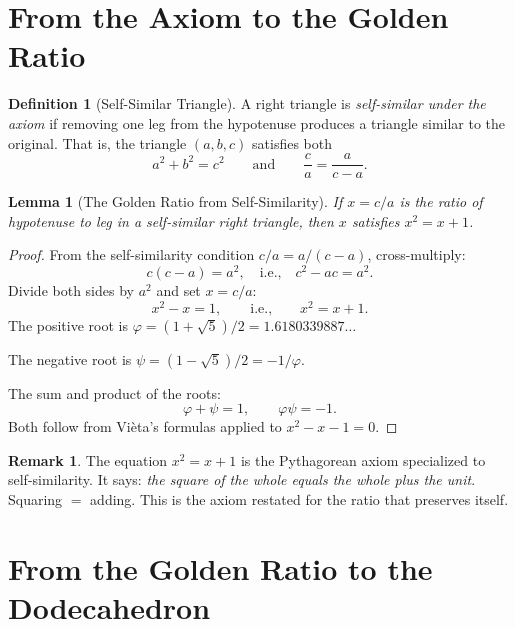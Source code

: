 \documentclass[11pt,a4paper]{article}
\theoremstyle{plain}
\newtheorem{lemma}[theorem]{Lemma}
\theoremstyle{definition}
\newtheorem{definition}[theorem]{Definition}
\newtheorem{remark}[theorem]{Remark}
\newcommand{\vp}{\varphi}
\begin{document}
\section{From the Axiom to the Golden Ratio}\label{sec:golden}

\begin{definition}[Self-Similar Triangle]\label{def:selfsim}
A right triangle is \emph{self-similar under the axiom} if removing one
leg from the hypotenuse produces a triangle similar to the original.
That is, the triangle $(a, b, c)$ satisfies both
\[
  a^2 + b^2 = c^2 \qquad\text{and}\qquad \frac{c}{a} = \frac{a}{c - a}.
\]
\end{definition}

\begin{lemma}[The Golden Ratio from Self-Similarity]\label{lem:golden}
If $x = c/a$ is the ratio of hypotenuse to leg in a self-similar right
triangle, then $x$ satisfies $x^2 = x + 1$.
\end{lemma}

\begin{proof}
From the self-similarity condition $c/a = a/(c-a)$, cross-multiply:
\[
  c(c - a) = a^2, \quad\text{i.e.,}\quad c^2 - ac = a^2.
\]
Divide both sides by $a^2$ and set $x = c/a$:
\[
  x^2 - x = 1, \qquad\text{i.e.,}\qquad x^2 = x + 1.
\]
The positive root is $\vp = (1+\sqrt{5})/2 = 1.6180339887\ldots$

The negative root is $\psi = (1-\sqrt{5})/2 = -1/\vp$.

The sum and product of the roots:
\[
  \vp + \psi = 1, \qquad \vp\psi = -1.
\]
Both follow from Vi\`{e}ta's formulas applied to $x^2 - x - 1 = 0$.
\end{proof}

\begin{remark}
The equation $x^2 = x + 1$ is the Pythagorean axiom specialized to
self-similarity.  It says: \emph{the square of the whole equals the
whole plus the unit}.  Squaring $=$ adding.  This is the axiom restated
for the ratio that preserves itself.
\end{remark}

\section{From the Golden Ratio to the Dodecahedron}\label{sec:dodec}
\end{document}

